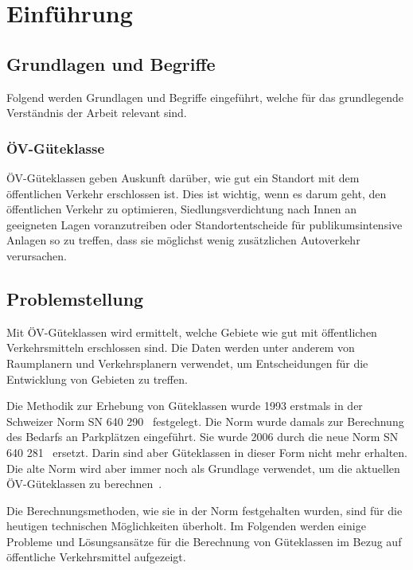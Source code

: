 
\section{Einführung}
\label{Einführung}


\subsection{Grundlagen und Begriffe}
\label{Einführung:Grundlagen und Begriffe}

Folgend werden Grundlagen und Begriffe eingeführt, welche für das grundlegende Verständnis der Arbeit relevant sind.

\subsubsection{ÖV-Güteklasse}
\label{Grundlagen und Begriffe:ÖV-Güteklasse}

\acs{ÖV}-Güteklassen geben Auskunft darüber, wie gut ein Standort mit dem öffentlichen Verkehr erschlossen ist.
Dies ist wichtig, wenn es darum geht, den öffentlichen Verkehr zu optimieren, Siedlungsverdichtung nach Innen an geeigneten Lagen voranzutreiben oder Standortentscheide für publikumsintensive Anlagen so zu treffen, dass sie möglichst wenig zusätzlichen Autoverkehr verursachen.~\cite{oev-guteklasse-gr-defintion}


\subsection{Problemstellung}
\label{Einführung:Problemstellung}

Mit \acs{ÖV}-Güteklassen wird ermittelt, welche Gebiete wie gut mit öffentlichen Verkehrsmitteln erschlossen sind.
Die Daten werden unter anderem von Raumplanern und Verkehrsplanern verwendet, um Entscheidungen für die Entwicklung von Gebieten zu treffen.

Die Methodik zur Erhebung von Güteklassen wurde 1993 erstmals in der Schweizer Norm SN 640 290~\cite{sn640290} festgelegt.
Die Norm wurde damals zur Berechnung des Bedarfs an Parkplätzen eingeführt.
Sie wurde 2006 durch die neue Norm SN 640 281~\cite{sn640281} ersetzt.
Darin sind aber Güteklassen in dieser Form nicht mehr erhalten. Die alte Norm wird aber immer noch als Grundlage verwendet, um die aktuellen \acs{ÖV}-Güteklassen zu berechnen~\cite{berechnung_are}.

Die Berechnungsmethoden, wie sie in der Norm festgehalten wurden, sind für die heutigen technischen Möglichkeiten überholt.
Im Folgenden werden einige Probleme und Lösungsansätze für die Berechnung von Güteklassen im Bezug auf öffentliche Verkehrsmittel aufgezeigt.

